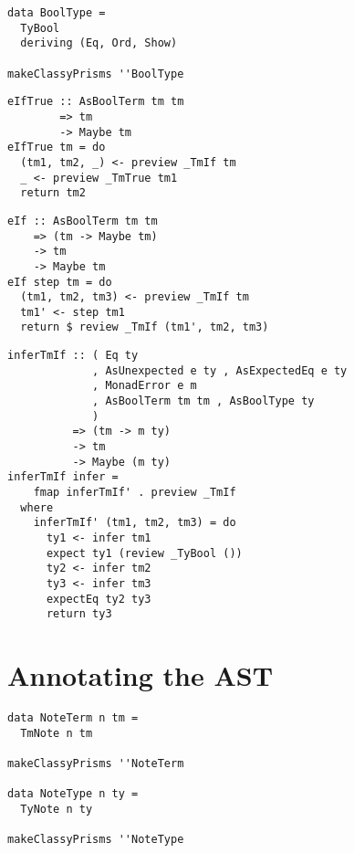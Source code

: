 \documentclass{beamer}
\begin{document}
\begin{frame}[fragile]
  \begin{verbatim}
data BoolType =
  TyBool
  deriving (Eq, Ord, Show)

makeClassyPrisms ''BoolType
  \end{verbatim}
\end{frame} 

\begin{frame}[fragile]
  \begin{verbatim}
eIfTrue :: AsBoolTerm tm tm
        => tm
        -> Maybe tm
eIfTrue tm = do
  (tm1, tm2, _) <- preview _TmIf tm
  _ <- preview _TmTrue tm1
  return tm2
  \end{verbatim}
\end{frame} 

\begin{frame}[fragile]
  \begin{verbatim}
eIf :: AsBoolTerm tm tm
    => (tm -> Maybe tm)
    -> tm
    -> Maybe tm
eIf step tm = do
  (tm1, tm2, tm3) <- preview _TmIf tm
  tm1' <- step tm1
  return $ review _TmIf (tm1', tm2, tm3)
  \end{verbatim}
\end{frame} 

\begin{frame}[fragile]
  \begin{verbatim}
inferTmIf :: ( Eq ty
             , AsUnexpected e ty , AsExpectedEq e ty
             , MonadError e m
             , AsBoolTerm tm tm , AsBoolType ty
             )
          => (tm -> m ty)
          -> tm
          -> Maybe (m ty)
inferTmIf infer =
    fmap inferTmIf' . preview _TmIf
  where
    inferTmIf' (tm1, tm2, tm3) = do
      ty1 <- infer tm1
      expect ty1 (review _TyBool ())
      ty2 <- infer tm2
      ty3 <- infer tm3
      expectEq ty2 ty3
      return ty3
  \end{verbatim}
\end{frame} 

\section{Annotating the AST}

\begin{frame}[fragile]
  \begin{verbatim}
data NoteTerm n tm =
  TmNote n tm

makeClassyPrisms ''NoteTerm

data NoteType n ty =
  TyNote n ty

makeClassyPrisms ''NoteType
  \end{verbatim}
\end{frame} 
\end{document}
